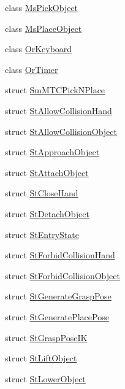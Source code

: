 \begin{DoxyCompactItemize}
\item 
class \hyperlink{classsm__mtc__picknplace_1_1MsPickObject}{Ms\+Pick\+Object}
\item 
class \hyperlink{classsm__mtc__picknplace_1_1MsPlaceObject}{Ms\+Place\+Object}
\item 
class \hyperlink{classsm__mtc__picknplace_1_1OrKeyboard}{Or\+Keyboard}
\item 
class \hyperlink{classsm__mtc__picknplace_1_1OrTimer}{Or\+Timer}
\item 
struct \hyperlink{structsm__mtc__picknplace_1_1SmMTCPickNPlace}{Sm\+M\+T\+C\+Pick\+N\+Place}
\item 
struct \hyperlink{structsm__mtc__picknplace_1_1StAllowCollisionHand}{St\+Allow\+Collision\+Hand}
\item 
struct \hyperlink{structsm__mtc__picknplace_1_1StAllowCollisionObject}{St\+Allow\+Collision\+Object}
\item 
struct \hyperlink{structsm__mtc__picknplace_1_1StApproachObject}{St\+Approach\+Object}
\item 
struct \hyperlink{structsm__mtc__picknplace_1_1StAttachObject}{St\+Attach\+Object}
\item 
struct \hyperlink{structsm__mtc__picknplace_1_1StCloseHand}{St\+Close\+Hand}
\item 
struct \hyperlink{structsm__mtc__picknplace_1_1StDetachObject}{St\+Detach\+Object}
\item 
struct \hyperlink{structsm__mtc__picknplace_1_1StEntryState}{St\+Entry\+State}
\item 
struct \hyperlink{structsm__mtc__picknplace_1_1StForbidCollisionHand}{St\+Forbid\+Collision\+Hand}
\item 
struct \hyperlink{structsm__mtc__picknplace_1_1StForbidCollisionObject}{St\+Forbid\+Collision\+Object}
\item 
struct \hyperlink{structsm__mtc__picknplace_1_1StGenerateGraspPose}{St\+Generate\+Grasp\+Pose}
\item 
struct \hyperlink{structsm__mtc__picknplace_1_1StGeneratePlacePose}{St\+Generate\+Place\+Pose}
\item 
struct \hyperlink{structsm__mtc__picknplace_1_1StGraspPoseIK}{St\+Grasp\+Pose\+IK}
\item 
struct \hyperlink{structsm__mtc__picknplace_1_1StLiftObject}{St\+Lift\+Object}
\item 
struct \hyperlink{structsm__mtc__picknplace_1_1StLowerObject}{St\+Lower\+Object}
\item 

\end{DoxyCompactItemize}
